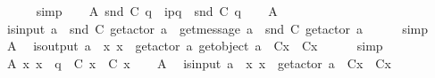 \begin{isabellebody}
\ \ \ \ \isamarkupfalse%
\ simp\isanewline
\ \ \isamarkupfalse%
\ A{}{\isacharcolon}{\kern0pt}\ {\isachardoublequoteopen}snd\ {\isacharparenleft}{\kern0pt}C{}\ q{\isacharparenright}{\kern0pt}\ {\isacharequal}{\kern0pt}\ {\isacharbrackleft}{\kern0pt}i\isactrlbsup p{\isasymrightarrow}q\isactrlesup {\isacharbrackright}{\kern0pt}\ {\isasymcdot}\ snd\ {\isacharparenleft}{\kern0pt}C{}\ q{\isacharparenright}{\kern0pt}{\isachardoublequoteclose}\isanewline
\ \ \isamarkupfalse%
\ A{}\ \isamarkupfalse%
\ {\isachardoublequoteopen}is{\isacharunderscore}{\kern0pt}input\ a\ {\isasymLongrightarrow}\ {\isacharparenleft}{\kern0pt}snd\ {\isacharparenleft}{\kern0pt}C{}\ {\isacharparenleft}{\kern0pt}get{\isacharunderscore}{\kern0pt}actor\ a{\isacharparenright}{\kern0pt}{\isacharparenright}{\kern0pt}{\isacharparenright}{\kern0pt}\ {\isacharequal}{\kern0pt}\ {\isacharbrackleft}{\kern0pt}get{\isacharunderscore}{\kern0pt}message\ a{\isacharbrackright}{\kern0pt}\ {\isasymcdot}\ snd\ {\isacharparenleft}{\kern0pt}C{}\ {\isacharparenleft}{\kern0pt}get{\isacharunderscore}{\kern0pt}actor\ a{\isacharparenright}{\kern0pt}{\isacharparenright}{\kern0pt}{\isachardoublequoteclose}\isanewline
\ \ \ \ \isamarkupfalse%
\ simp\isanewline
\ \ \isamarkupfalse%
\ A{}\ \isamarkupfalse%
\ {\isachardoublequoteopen}is{\isacharunderscore}{\kern0pt}output\ a\ {\isasymLongrightarrow}\ {\isasymforall}x{\isachardot}{\kern0pt}\ x\ {\isasymnotin}\ {\isacharbraceleft}{\kern0pt}get{\isacharunderscore}{\kern0pt}actor\ a{\isacharcomma}{\kern0pt}\ get{\isacharunderscore}{\kern0pt}object\ a{\isacharbraceright}{\kern0pt}\ {\isasymlongrightarrow}\ C{}{\isacharparenleft}{\kern0pt}x{\isacharparenright}{\kern0pt}\ {\isacharequal}{\kern0pt}\ C{}{\isacharparenleft}{\kern0pt}x{\isacharparenright}{\kern0pt}{\isachardoublequoteclose}\isanewline
\ \ \ \ \isamarkupfalse%
\ simp\isanewline
\ \ \isamarkupfalse%
\ A{}{\isacharcolon}{\kern0pt}\ {\isachardoublequoteopen}{\isasymforall}x{\isachardot}{\kern0pt}\ x\ {\isasymnoteq}\ q\ {\isasymlongrightarrow}\ C{}\ x\ {\isacharequal}{\kern0pt}\ C{}\ x{\isachardoublequoteclose}\isanewline
\ \ \isamarkupfalse%
\ A{}\ \isamarkupfalse%
\ {\isachardoublequoteopen}is{\isacharunderscore}{\kern0pt}input\ a\ {\isasymLongrightarrow}\ {\isasymforall}x{\isachardot}{\kern0pt}\ x\ {\isasymnoteq}\ get{\isacharunderscore}{\kern0pt}actor\ a\ {\isasymlongrightarrow}\ C{}{\isacharparenleft}{\kern0pt}x{\isacharparenright}{\kern0pt}\ {\isacharequal}{\kern0pt}\ C{}{\isacharparenleft}{\kern0pt}x{\isacharparenright}{\kern0pt}{\isachardoublequoteclose}\isanewline

\end{isabellebody}
